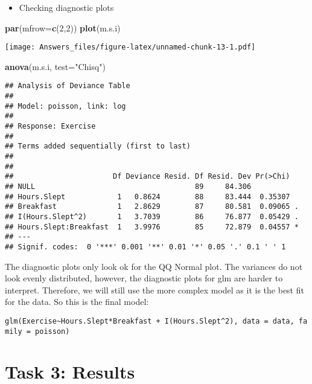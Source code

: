 \documentclass[
]{article}
\newenvironment{Shaded}{\begin{snugshade}}{\end{snugshade}}
\newcommand{\AttributeTok}[1]{\textcolor[rgb]{0.13,0.29,0.53}{#1}}
\newcommand{\DecValTok}[1]{\textcolor[rgb]{0.00,0.00,0.81}{#1}}
\newcommand{\FunctionTok}[1]{\textcolor[rgb]{0.13,0.29,0.53}{\textbf{#1}}}
\newcommand{\NormalTok}[1]{#1}
\newcommand{\StringTok}[1]{\textcolor[rgb]{0.31,0.60,0.02}{#1}}
\providecommand{\tightlist}{%
  \setlength{\itemsep}{0pt}\setlength{\parskip}{0pt}}
\begin{document}
\begin{itemize}
\tightlist
\item
  Checking diagnostic plots
\end{itemize}

\begin{Shaded}
\begin{Highlighting}[]
\FunctionTok{par}\NormalTok{(}\AttributeTok{mfrow=}\FunctionTok{c}\NormalTok{(}\DecValTok{2}\NormalTok{,}\DecValTok{2}\NormalTok{))}
\FunctionTok{plot}\NormalTok{(m.s.i)}
\end{Highlighting}
\end{Shaded}

\texttt{[image: Answers\_files/figure-latex/unnamed-chunk-13-1.pdf]}

\begin{Shaded}
\begin{Highlighting}[]
\FunctionTok{anova}\NormalTok{(m.s.i, }\AttributeTok{test=}\StringTok{"Chisq"}\NormalTok{)}
\end{Highlighting}
\end{Shaded}

\begin{verbatim}
## Analysis of Deviance Table
## 
## Model: poisson, link: log
## 
## Response: Exercise
## 
## Terms added sequentially (first to last)
## 
## 
##                       Df Deviance Resid. Df Resid. Dev Pr(>Chi)  
## NULL                                     89     84.306           
## Hours.Slept            1   0.8624        88     83.444  0.35307  
## Breakfast              1   2.8629        87     80.581  0.09065 .
## I(Hours.Slept^2)       1   3.7039        86     76.877  0.05429 .
## Hours.Slept:Breakfast  1   3.9976        85     72.879  0.04557 *
## ---
## Signif. codes:  0 '***' 0.001 '**' 0.01 '*' 0.05 '.' 0.1 ' ' 1
\end{verbatim}

The diagnostic plots only look ok for the QQ Normal plot. The variances
do not look evenly distributed, however, the diagnostic plots for glm
are harder to interpret. Therefore, we will still use the more complex
model as it is the best fit for the data. So this is the final model:

\texttt{glm(Exercise\textasciitilde{}Hours.Slept*Breakfast\ +\ I(Hours.Slept\^{}2),\ data\ =\ data,\ family\ =\ poisson)}

\section{Task 3: Results}\label{task-3-results}
\end{document}
